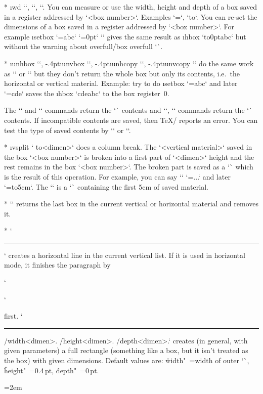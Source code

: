 {{* \i wd ``, ``, ``. You can
  measure or use the width, height and depth of a box saved in a register addressed
  by `<box number>`. Examples `\mydimen=`, `\hbox to`. 
  You can re-set the dimensions of a box saved in a register addressed by 
  `<box number>`. For example \i setbox `=\hbox{abc}` `=0pt` ``
  gives the same result as \i hbox `\hbox to0pt{abc}` but without the warning about
  \ii overfull/box overfull `\hbox`.

* \i unhbox ``, \kern-.4pt\i unvbox ``, 
  \kern-.4pt\i unhcopy ``, \kern-.4pt\i unvcopy ``
  do the same work as `\box` or `\copy` but they don't return the whole
  box but only its contents, i.e.~the horizontal or vertical material.
  Example: try to do \i setbox `=\hbox{abc}` and later 
  `=\hbox{cde}` saves
  the \i hbox `\hbox{cdeabc}` to the box register~0. 

  The \x`\unhbox` and \x`\unhcopy` commands return the \x`\hbox` contents and 
  \x`\unvbox`, \x`\unvcopy` commands return the \x`\vbox` contents. If incompatible
  contents are saved, then \TeX/ reports an error. You can test the type of
  saved contents by \x`\ifhbox` or \x`\ifvbox`.

* \i vsplit ` to<dimen>` does a column break. 
  The `<vertical material>` saved in the box `<box number>` is broken
  into a first part of `<dimen>` height and the rest remains in the
  box `<box number>`. The broken part is saved as a `\vbox` which is the
  result of this operation. For example, you can say `\newbox\column`
  `\setbox\column=\vbox{...}` and later 
  `=\vsplit\column to5cm`. The `` is a `\vbox` containing the first 5cm of
  saved material.

* \x`\lastbox` returns the last box in the current vertical or horizontal
  material and removes it. 
\enditems


\begitems
* \x`\hrule` creates a horizontal line in the current vertical
  list. If it is used in horizontal mode, it finishes the paragraph by
  {\noda\x`\par`} first.
  `\hrule /width<dimen>. /height<dimen>. /depth<dimen>.` creates (in
  general, with given parameters) a full
  rectangle (something like a box, but it isn't treated as the box) with given
  dimensions. Default values are: \"width"~=width of outer \x`\vbox`,
  \"height"~=0.4\,pt, \"depth"~=0\,pt.
  {\emergencystretch=2em\par}

}}
